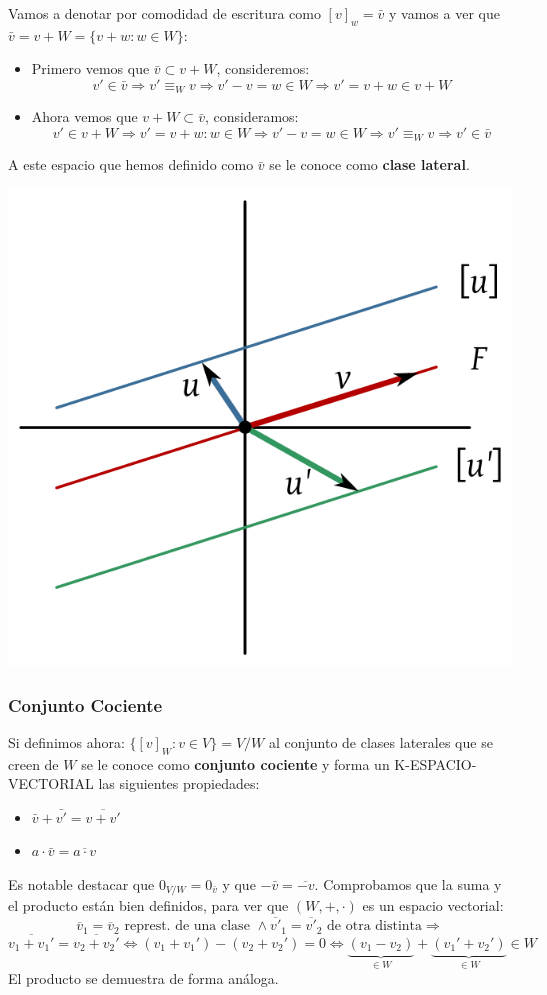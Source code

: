 \documentclass[10pt,a4paper,openright]{book}
\begin{document}
Vamos a denotar por comodidad de escritura como $[v]_w=\bar{v}$ y vamos a ver que $\bar{v}=v+W=\{v+w: w\in W\}$:
\begin{itemize}
\item Primero vemos que $\bar{v}\subset v+W$, consideremos:
$$v'\in\bar{v}\Rightarrow v'\equiv_W v\Rightarrow v'-v=w\in W\Rightarrow v'=v+w\in v+ W$$

\item Ahora vemos que $v+W\subset \bar{v}$, consideramos:
$$v'\in v+W\Rightarrow v'=v+w : w\in W\Rightarrow v'-v=w\in W\Rightarrow v'\equiv_W v\Rightarrow v'\in \bar{v}$$
\end{itemize}

A este espacio que hemos definido como $\bar{v}$ se le conoce como \textbf{clase lateral}.
\begin{center}
\includegraphics[scale=0.25]{clase lateral}
\end{center}

\subsubsection*{Conjunto Cociente}
Si definimos ahora: $\{[v]_W: v\in V\}=V/W$ al conjunto de clases laterales que se creen de $W$ se le conoce como \textbf{conjunto cociente} y forma un K-ESPACIO-VECTORIAL las siguientes propiedades:
\begin{itemize}
\item $\bar{v}+\bar{v'}=\overline{v+v'}$
\item $a\cdot \bar{v}=\overline{a\cdot v}$
\end{itemize}
Es notable destacar que $0_{V/W}=0_{\bar{v}}$ y que $-\bar{v}=\overline{-v}$. Comprobamos que la suma y el producto están bien definidos, para ver que $(W, +, \cdot )$ es un espacio vectorial:
$$\overline{v}_1=\overline{v}_2 \mbox{ represt. de una clase }\wedge \overline{v'}_1=\overline{v'}_2 \mbox{ de otra distinta}\Rightarrow$$
$$\overline{v_1+v_1'}=\overline{v_2+v_2'}\Leftrightarrow (v_1+v_1')-(v_2+v_2')=0\Leftrightarrow \underbrace{(v_1-v_2)}_{\in W}+\underbrace{(v_1'+v_2')}_{\in W}\in W$$
El producto se demuestra de forma análoga.
\end{document}
